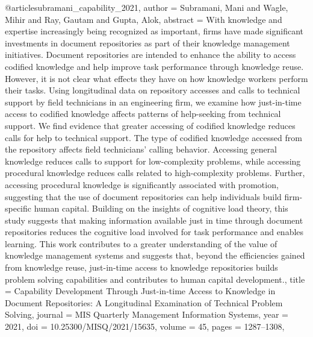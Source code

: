 @article{subramani_capability_2021,
  author = {Subramani, Mani and Wagle, Mihir and Ray, Gautam and Gupta, Alok},
  abstract = {With knowledge and expertise increasingly being recognized as important, firms have made significant investments in document repositories as part of their knowledge management initiatives. Document repositories are intended to enhance the ability to access codified knowledge and help improve task performance through knowledge reuse. However, it is not clear what effects they have on how knowledge workers perform their tasks. Using longitudinal data on repository accesses and calls to technical support by field technicians in an engineering firm, we examine how just-in-time access to codified knowledge affects patterns of help-seeking from technical support. We find evidence that greater accessing of codified knowledge reduces calls for help to technical support. The type of codified knowledge accessed from the repository affects field technicians’ calling behavior. Accessing general knowledge reduces calls to support for low-complexity problems, while accessing procedural knowledge reduces calls related to high-complexity problems. Further, accessing procedural knowledge is significantly associated with promotion, suggesting that the use of document repositories can help individuals build firm-specific human capital. Building on the insights of cognitive load theory, this study suggests that making information available just in time through document repositories reduces the cognitive load involved for task performance and enables learning. This work contributes to a greater understanding of the value of knowledge management systems and suggests that, beyond the efficiencies gained from knowledge reuse, just-in-time access to knowledge repositories builds problem solving capabilities and contributes to human capital development.},
  title = {{Capability} {Development} {Through} {Just-in-time} {Access} {to} {Knowledge} {in} {Document} {Repositories}: {A} {Longitudinal} {Examination} {of} {Technical} {Problem} {Solving}},
  journal = {MIS Quarterly Management Information Systems},
  year = {2021},
  doi = {10.25300/MISQ/2021/15635},
  volume = {45},
  pages = {1287--1308},
}

